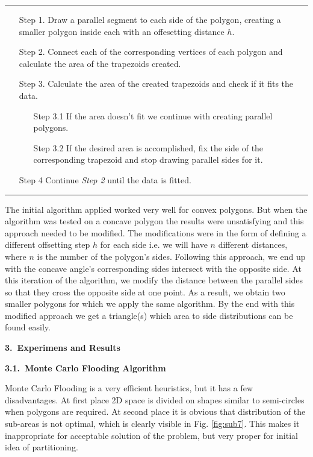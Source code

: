 \documentclass[11pt,leqno]{book}
\newcommand{\sect}[1]{\vskip7mm\par{\large \bf #1}}
\newcommand{\subsect}[1]{\vskip 3mm\par{\bf#1}}
\begin{document}
\noindent\rule{\textwidth}{1pt}
\begin{itemize}

\item[Step 1.] Draw a parallel segment to each side of the polygon, creating a smaller polygon inside each with an offesetting distance $h$. 
\item[Step 2.] Connect each of the corresponding vertices of each polygon and calculate the area of the trapezoids created.
\item[Step 3.] Calculate the area of the created trapezoids and check if it fits the data.
\begin{itemize}
\item[Step 3.1] If the area doesn't fit we continue with creating parallel polygons.
\item[Step 3.2] If the desired area is accomplished, fix the side of the corresponding trapezoid and stop drawing parallel sides for it.
\end{itemize}
  \item[Step 4] Continue \textit{Step 2} until the data is fitted.
\end{itemize}
\noindent\rule{\textwidth}{1pt}

The initial algorithm applied worked very well for convex polygons. But when the algorithm was tested on a concave polygon the results were unsatisfying and this approach needed to be modified. The modifications were in the form of defining a different offsetting step $h$ for each side i.e. we will have $n$ different distances, where $n$ is the number of the polygon's sides. Following this approach, we end up with the concave angle's corresponding sides intersect with the opposite side. At this iteration of the algorithm, we modify the distance between the parallel sides so that they cross the opposite side at one point. As a result, we obtain two smaller polygons for which we apply the same algorithm. By the end with this modified approach we get a triangle(s) which area to side distributions can be found easily.

\sect{3.~Experimens and Results}

\subsect{3.1.~Monte Carlo Flooding Algorithm}

Monte Carlo Flooding is a very efficient heuristics, but it has a few disadvantages. At first place 2D space is divided on shapes similar to semi-circles when polygons are required. At second place it is obvious that distribution of the sub-areas is not optimal, which is clearly visible in Fig. \ref{fig:sub7}. This makes it inappropriate for acceptable solution of the problem, but very proper for initial idea of partitioning. 
\end{document}
